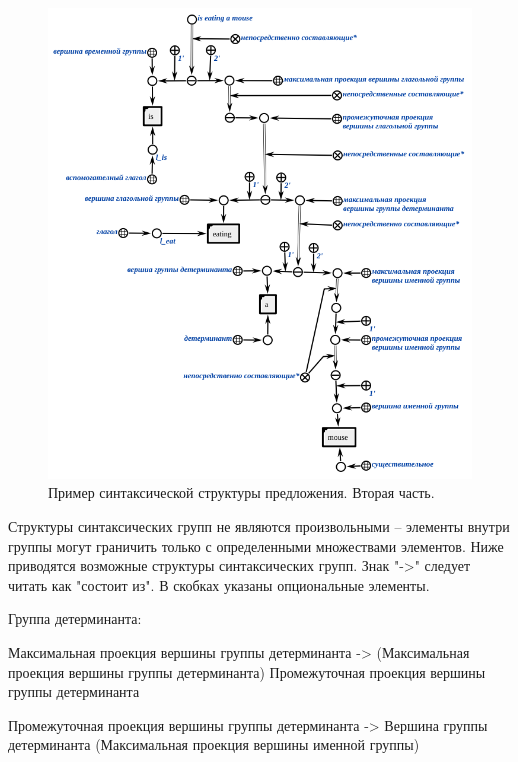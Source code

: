 \begin{figure}[h]
    \centering
    \includegraphics[scale=0.8]{images/part2/chapter_lang/syntactic_structure_part_2}
    \caption{Пример синтаксической структуры предложения. Вторая часть.}
    \label{fig:pic_syntactic_tree_part_2}
\end{figure}

Структуры синтаксических групп не являются произвольными -- элементы внутри группы могут граничить только с определенными множествами элементов.
Ниже приводятся возможные структуры синтаксических групп.
Знак "->"{} следует читать как "состоит из"{}.
В скобках указаны опциональные элементы.

Группа детерминанта:
\begin{textitemize}
    \item Максимальная проекция вершины группы детерминанта -> (Максимальная проекция вершины группы детерминанта) Промежуточная проекция вершины группы детерминанта
    \item Промежуточная проекция вершины группы детерминанта -> Вершина группы детерминанта (Максимальная проекция вершины именной группы)
\end{textitemize}


